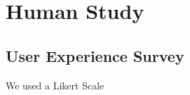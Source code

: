 \chapter{Human Study}\label{ch:human_study}

\section{User Experience Survey}
We used a Likert Scale \cite{likert1932technique}
